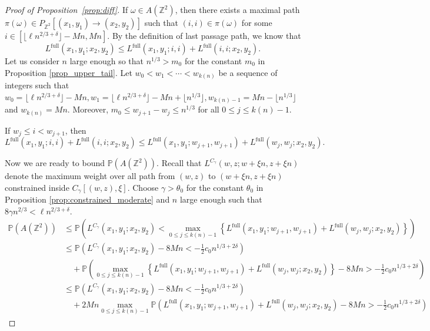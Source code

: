 \documentclass[11pt]{article}
\theoremstyle{definition}
\newcommand{\Z}{\mathbb{Z}}
\newcommand{\Prob}{\mathbb{P}}
\newcommand{\Lfull}{L^{\mathrm{full}}}
\begin{document}
\begin{proof}[Proof of Proposition~\ref{prop:diff}]
If $\omega \in A(\Z^2)$, then there exists a maximal path $\pi(\omega) \in P_{\Z^2}[(x_1,y_1) \rightarrow (x_2,y_2)]$ such that $(i,i) \in \pi(\omega)$ for some $i \in [\lfloor \ell n^{2/3+\delta} \rfloor -Mn,Mn].$ By the definition of last passage path, we know that
\begin{equation}
    \Lfull(x_1,y_1; x_2,y_2) \leq \Lfull(x_1,y_1; i,i) + \Lfull(i,i;x_2,y_2).
\end{equation}
Let us consider $n$ large enough so that $n^{1/3} > m_0$ for the constant $m_0$ in Proposition \ref{prop_upper_tail}. Let $w_0 < w_1 < \cdots < w_{k(n)}$ be a sequence of integers such that $w_0=\lfloor \ell n^{2/3+\delta} \rfloor -Mn, w_1 = \lfloor \ell n^{2/3+\delta} \rfloor -Mn + \lfloor n^{1/3} \rfloor , w_{k(n)-1} = Mn -\lfloor n^{1/3} \rfloor$ and $w_{k(n)} = Mn$. Moreover, $m_0 \leq w_{j+1} - w_j \leq n^{1/3}$ for all $0 \leq j \leq k(n)-1$.

If $w_j \leq  i < w_{j+1}$, then
\begin{equation}
    \Lfull(x_1,y_1; i,i) + \Lfull(i,i;x_2,y_2) \leq \Lfull(x_1,y_1; w_{j+1},w_{j+1}) + \Lfull(w_j,w_j;x_2,y_2).
\end{equation}

Now we are ready to bound $\Prob(A(\Z^2))$. Recall that $L^{C_\gamma}(w,z;w+\xi n, z+ \xi n)$ denote the maximum weight over all path from $(w,z)$ to $(w+\xi n, z+ \xi n)$ constrained inside $C_\gamma\left[(w,z), \xi\right]$. Choose $\gamma > \theta_0$ for the constant $\theta_0$ in Proposition \ref{prop:constrained_moderate} and $n$ large enough such that $8\gamma n^{2/3} < \ell n^{2/3+\delta}$.
\[
    \begin{aligned}
        \Prob(A(\Z^2)) &\leq \Prob\left(L^{C_\gamma}(x_1,y_1; x_2,y_2) < \max_{0 \leq j \leq k(n)-1} \left\{\Lfull(x_1,y_1; w_{j+1},w_{j+1}) + \Lfull(w_j,w_j;x_2,y_2)\right\} \right)\\
        &\leq \Prob\left(L^{C_\gamma}(x_1,y_1; x_2,y_2) - 8Mn < -\frac{1}{2}c_0 n^{1/3+2\delta} \right)\\ 
         &\quad + \Prob\left( \max_{0 \leq j \leq k(n)-1}\left\{\Lfull(x_1,y_1; w_{j+1},w_{j+1}) + \Lfull(w_j,w_j;x_2,y_2)\right\} -8Mn > -\frac{1}{2}c_0 n^{1/3+2\delta} \right)\\
         &\leq \Prob\left(L^{C_\gamma}(x_1,y_1; x_2,y_2) - 8Mn < -\frac{1}{2}c_0 n^{1/3+2\delta} \right)\\ 
         &\quad +  2Mn \max_{0 \leq j \leq k(n)-1}\Prob\left(\Lfull(x_1,y_1; w_{j+1},w_{j+1}) + \Lfull(w_j,w_j;x_2,y_2) -8Mn > -\frac{1}{2}c_0 n^{1/3+2\delta} \right)
    \end{aligned}
\]


\end{proof}
\end{document}
